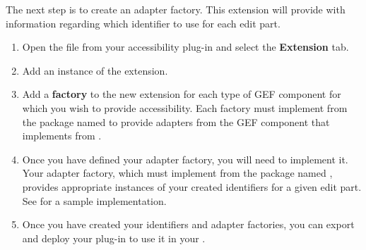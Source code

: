 The next step is to create an adapter factory. This extension will provide
\app{} with information regarding which identifier to use for each edit part.
\begin{enumerate}
\item  Open the  file from your accessibility plug-in and
select the \textbf{Extension} tab. %


\item Add an instance of the 
extension.
\item Add a \textbf{factory} to the new extension for each type of GEF component
for which you wish to provide accessibility. Each factory must implement
 from the package named
 to provide adapters from
the GEF component that implements  from
. %


\item Once you have defined your adapter factory, you will need to implement it.
Your adapter factory, which must implement  from the
package named , provides appropriate
instances of your created identifiers for a given edit part. See
 for a sample implementation.


\item Once you have created your identifiers and adapter factories, you can
export and deploy your plug-in to use it in your \gdaut{}.



\end{enumerate}

